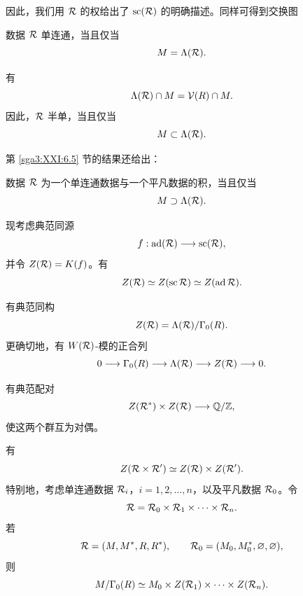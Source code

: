 因此，我们用 \(\mathcal{R}\) 的权给出了 \(\operatorname{sc}(\mathcal{R})\) 的明确描述。同样可得到交换图
\begin{center}
\end{center}

\begin{corollary}\label{sga3:XXI:6.6.7}
数据 \(\mathcal{R}\) 单连通，当且仅当
\[
 M=\Lambda(\mathcal{R}).
\]
\end{corollary}

\begin{remark}\label{sga3:XXI:6.6.8}
有
\[
 \Lambda(\mathcal{R})\cap M=\mathcal{V}(R)\cap M.
\]
因此，\(\mathcal{R}\) 半单，当且仅当
\[
 M\subset\Lambda(\mathcal{R}).
\]
\end{remark}

第 \ref{sga3:XXI:6.5} 节的结果还给出：

\begin{corollary}\label{sga3:XXI:6.6.9}
数据 \(\mathcal{R}\) 为一个单连通数据与一个平凡数据的积，当且仅当
\[
 M\supset\Lambda(\mathcal{R}).
\]
\end{corollary}

现考虑典范同源
\[
 f:\operatorname{ad}(\mathcal{R})\longrightarrow\operatorname{sc}(\mathcal{R}),
\]
并令 \(Z(\mathcal{R})=K(f)\)。有
\[
 Z(\mathcal{R})\simeq Z(\operatorname{sc}\mathcal{R})
 \simeq Z(\operatorname{ad}\mathcal{R}).
\]

\begin{corollary}\label{sga3:XXI:6.6.10}
有典范同构
\[
 Z(\mathcal{R})=\Lambda(\mathcal{R})/\Gamma_0(R).
\]
更确切地，有 \(W(\mathcal{R})\)-模的正合列
\[
 0\longrightarrow\Gamma_0(R)\longrightarrow\Lambda(\mathcal{R})
 \longrightarrow Z(\mathcal{R})\longrightarrow0.
\]
\end{corollary}

\begin{corollary}\label{sga3:XXI:6.6.11}
有典范配对
\[
 Z(\mathcal{R}^\ast)\times Z(\mathcal{R})\longrightarrow\mathbb Q/\mathbb Z,
\]
使这两个群互为对偶。
\end{corollary}

\begin{remark}\label{sga3:XXI:6.6.12}
有
\[
 Z(\mathcal{R}\times\mathcal{R}')\simeq Z(\mathcal{R})\times Z(\mathcal{R}').
\]
特别地，考虑单连通数据 \(\mathcal{R}_i\)，\(i=1,2,\ldots,n\)，以及平凡数据 \(\mathcal{R}_0\)。令
\[
 \mathcal{R}=\mathcal{R}_0\times\mathcal{R}_1\times\cdots\times\mathcal{R}_n.
\]
若
\[
 \mathcal{R}=(M,M^\ast,R,R^\ast),
 \qquad
 \mathcal{R}_0=(M_0,M_0^\ast,\varnothing,\varnothing),
\]
则
\[
 M/\Gamma_0(R)\simeq
 M_0\times Z(\mathcal{R}_1)\times\cdots\times Z(\mathcal{R}_n).
\]
\end{remark}

